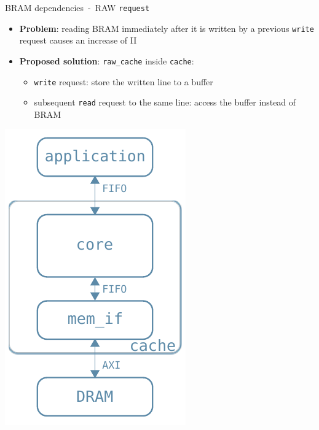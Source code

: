 \documentclass{beamer}
\begin{document}
\begin{frame}{BRAM dependencies~-~RAW \texttt{request}}
	\begin{minipage}{.7\textwidth}
		\begin{itemize}[<+->]
			\item \textbf{Problem}:
				reading BRAM immediately after it is written by
				a previous \texttt{write} request causes an
				increase of II
			\item \textbf{Proposed solution}:
				\texttt{raw\_cache} inside \texttt{cache}:
				\begin{itemize}[<.->]
					\item \texttt{write} request: store the
						written line to a buffer
					\item subsequent \texttt{read} request to
						the same line: access the buffer
						instead of BRAM
				\end{itemize}
		\end{itemize}
	\end{minipage}
	\begin{minipage}{.28\textwidth}
		\begin{center}
			\includegraphics[width=.9\textwidth,height=.9\textheight,keepaspectratio]{internal_arch.pdf}
		\end{center}
	\end{minipage}
\end{frame}
\end{document}
